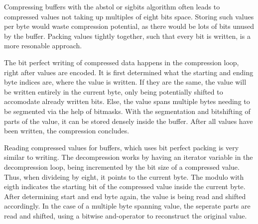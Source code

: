 \documentclass[
	12pt,
	a4paper,
	BCOR10mm,
	DIV14,
	headsepline,
]{scrreprt}
\begin{document}
Compressing buffers with the abstol or sigbits algorithm often leads to
compressed values not taking up multiples of eight bits space. Storing such
values per byte would waste compression potential, as there would be lots of
bits unused by the buffer. Packing values tightly together, such that every bit
is written, is a more resonable approach. \par
The bit perfect writing of compressed data happens in the compression loop,
right after values are encoded. It is first determined what the starting and
ending byte indices are, where the value is written. If they are the same, the
value will be written entirely in the current byte, only being potentially
shifted to accomodate already written bits. Else, the value spans multiple
bytes needing to be segmented via the help of bitmasks. With the segmentation
and bitshifting of parts of the value, it can be stored densely inside the
buffer. After all values have been written, the compression concludes. \par
Reading compressed values for buffers, which uses bit perfect packing is very
similar to writing. The decompression works by having an iterator variable in
the decompression loop, being incremented by the bit size of a compressed value.
Thus, when divideing by eight, it points to the current byte. The modulo with
eigth indicates the starting bit of the compressed value inside the current
byte. After determining start and end byte again, the value is being read and
shifted accordingly. In the case of a multiple byte spanning value, the seperate
parts are read and shifted, using a bitwise and-operator to reconstruct the
original value.
\end{document}
